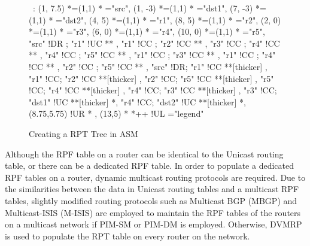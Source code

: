\begin{figure}[Hp]
\label{fig:asm-rpt}

\begin{center}

\ \xy<1cm,0cm>:
(1, 7.5)  *=(1,1) 	  	*\frm{-}  ="src",
(1, -3)   *=(1,1) 	*\frm{-}  ="dst1",
(7, -3)   *=(1,1) 	*\frm{-}  ="dst2",
%
(4,  5)   *=(1,1)  *   ="r1",
(8,  5)   *=(1,1)  *   ="r2",
(2,  0)   *=(1,1)  *   ="r3",
(6,  0)   *=(1,1)  *   ="r4",
(10, 0)   *=(1,1)  *   ="r5",
%
"src" !DR ; "r1" !UC **\dir{~} ,
%
"r1" !CC ; "r2" !CC **\dir{~} ,
"r3" !CC ; "r4" !CC **\dir{~} ,
"r4" !CC ; "r5" !CC **\dir{~} ,
"r1" !CC ; "r3" !CC **\dir{~} ,
"r1" !CC ; "r4" !CC **\dir{~} ,
"r2" !CC ; "r5" !CC **\dir{~} ,
%
"src" !DR; "r1"   !CC **[thicker]\dir{=} ,
"r1"  !CC; "r2"   !CC **[thicker]\dir{=} ,
"r2"  !CC; "r5"   !CC **[thicker]\dir{=} ,
"r5"  !CC; "r4"   !CC **[thicker]\dir{=} ,
"r4"  !CC; "r3"   !CC **[thicker]\dir{=} ,
"r3"  !CC; "dst1" !UC **[thicker]\dir{=} *,
"r4"  !CC; "dst2" !UC **[thicker]\dir{=} *,
%
\POS (8.75,5.75) !UR * ,
%
\POS (13,5) * *++\frm{-} !UL ="legend"
\endxy

\end{center}

\caption{Creating a RPT Tree in ASM}

\end{figure}

Although the RPF table on a router can be identical to the Unicast
routing table, or there can be a dedicated RPF table. In order to 
populate a dedicated RPF tables on a router, dynamic multicast 
routing protocols are required. Due to the similarities between the data
in Unicast routing tables and a multicast RPF tables, slightly modified
routing protocols such as Multicast BGP (MBGP) and Multicast-ISIS
(M-ISIS) are employed to maintain the RPF tables of the routers on a
multicast network if PIM-SM or PIM-DM is employed. Otherwise, DVMRP is
used to populate the RPT table on every router on the network.


